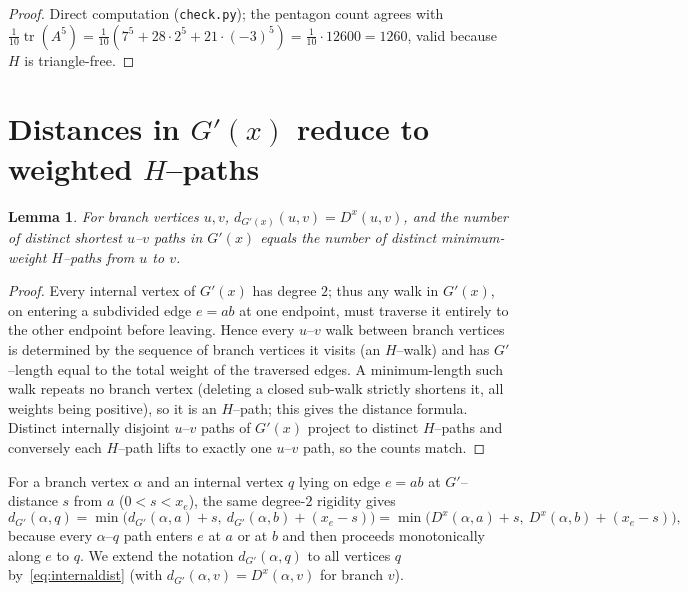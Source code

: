 \documentclass{amsart}
\newtheorem{lemma}{Lemma}
\theoremstyle{definition}
\begin{document}
\begin{proof}
Direct computation (\texttt{check.py}); the pentagon count agrees with
$\tfrac{1}{10}\operatorname{tr}(A^{5})=\tfrac{1}{10}(7^{5}+28\cdot2^{5}
+21\cdot(-3)^{5})=\tfrac{1}{10}\cdot12600=1260$, valid because $H$ is
triangle-free.
\end{proof}

\section{Distances in $G'(x)$ reduce to weighted $H$--paths}

\begin{lemma}\label{lem:distbranch}
For branch vertices $u,v$, $d_{G'(x)}(u,v)=D^x(u,v)$, and the number of distinct
shortest $u$--$v$ paths in $G'(x)$ equals the number of distinct minimum-weight
$H$--paths from $u$ to $v$.
\end{lemma}

\begin{proof}
Every internal vertex of $G'(x)$ has degree $2$; thus any walk in $G'(x)$, on
entering a subdivided edge $e=ab$ at one endpoint, must traverse it entirely to
the other endpoint before leaving. Hence every $u$--$v$ walk between branch
vertices is determined by the sequence of branch vertices it visits (an
$H$--walk) and has $G'$--length equal to the total weight of the traversed
edges. A minimum-length such walk repeats no branch vertex (deleting a closed
sub-walk strictly shortens it, all weights being positive), so it is an
$H$--path; this gives the distance formula. Distinct internally disjoint
$u$--$v$ paths of $G'(x)$ project to distinct $H$--paths and conversely each
$H$--path lifts to exactly one $u$--$v$ path, so the counts match.
\end{proof}

For a branch vertex $\alpha$ and an internal vertex $q$ lying on edge $e=ab$ at
$G'$--distance $s$ from $a$ ($0<s<x_e$), the same degree-$2$ rigidity gives
\begin{equation}\label{eq:internaldist}
d_{G'}(\alpha,q)=\min\!\big(d_{G'}(\alpha,a)+s,\ d_{G'}(\alpha,b)+(x_e-s)\big)
=\min\!\big(D^x(\alpha,a)+s,\ D^x(\alpha,b)+(x_e-s)\big),
\end{equation}
because every $\alpha$--$q$ path enters $e$ at $a$ or at $b$ and then proceeds
monotonically along $e$ to $q$. We extend the notation $d_{G'}(\alpha,q)$ to all
vertices $q$ by~\eqref{eq:internaldist} (with $d_{G'}(\alpha,v)=D^x(\alpha,v)$
for branch $v$).
\end{document}
